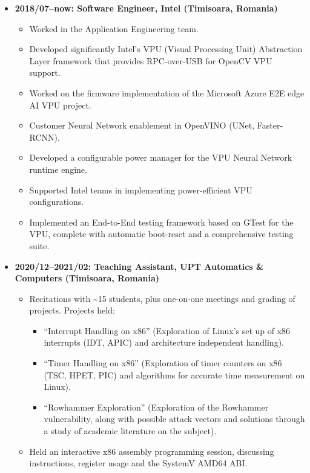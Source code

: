 \documentclass{article}
\newenvironment{tightitemize}
{\begin{itemize}
  \setlength{\itemsep}{1pt}
  \setlength{\parskip}{0pt}
  \setlength{\parsep}{0pt}}
{\end{itemize}}
\begin{document}
\begin{tightitemize}

\item \textbf{2018/07--now: Software Engineer, Intel (Timisoara, Romania)}
\begin{tightitemize}
    \item Worked in the Application Engineering team.
    \item Developed significantly Intel's VPU (Visual Processing Unit) Abstraction Layer
        framework that provides RPC-over-USB for OpenCV VPU support.
    \item Worked on the firmware implementation of the Microsoft Azure E2E edge AI
        VPU project.
    \item Customer Neural Network enablement in OpenVINO (UNet, Faster-RCNN).
    \item Developed a configurable power manager for the VPU Neural Network runtime
        engine.
    \item Supported Intel teams in implementing power-efficient VPU configurations.
    \item Implemented an End-to-End testing framework based on GTest for the
        VPU, complete with automatic boot-reset and a comprehensive testing
        suite.
\end{tightitemize}

\item \textbf{2020/12--2021/02: Teaching Assistant, UPT Automatics \& Computers
    (Timisoara, Romania)}
\begin{tightitemize}
\item Recitations with \textasciitilde15 students, plus one-on-one meetings and
    grading of projects. Projects held:
\begin{tightitemize}
    \item ``Interrupt Handling on x86'' (Exploration of Linux's set up of x86
        interrupts (IDT, APIC) and architecture independent handling).
    \item ``Timer Handling on x86'' (Exploration of timer counters on x86 (TSC,
        HPET, PIC) and algorithms for accurate time measurement on Linux).
    \item ``Rowhammer Exploration'' (Exploration of the Rowhammer vulnerability,
        along with possible attack vectors and solutions through a study of
            academic literature on the subject).
\end{tightitemize}
\item Held an interactive x86 assembly programming session, discussing
    instructions, register usage and the SystemV AMD64 ABI.
\end{tightitemize}


\end{tightitemize}
\end{document}
